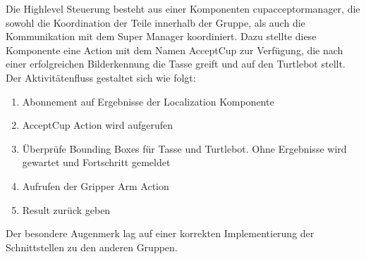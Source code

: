 Die Highlevel Steuerung besteht aus einer Komponenten \glqq cup\textunderscore acceptor\textunderscore manager\grqq, die sowohl die Koordination der Teile innerhalb der Gruppe, als auch die Kommunikation mit dem Super Manager koordiniert. Dazu stellte diese Komponente eine Action mit dem Namen AcceptCup zur Verfügung, die nach einer erfolgreichen Bilderkennung die Tasse greift und auf den Turtlebot stellt. Der Aktivitätenfluss gestaltet sich wie folgt:
\begin{enumerate}
\item Abonnement auf Ergebnisse der Localization Komponente
\item AcceptCup Action wird aufgerufen
\item Überprüfe Bounding Boxes für Tasse und Turtlebot. Ohne Ergebnisse wird gewartet und Fortschritt gemeldet
\item Aufrufen der Gripper Arm Action
\item Result zurück geben
\end{enumerate}

Der besondere Augenmerk lag auf einer korrekten Implementierung der Schnittstellen zu den anderen Gruppen.
